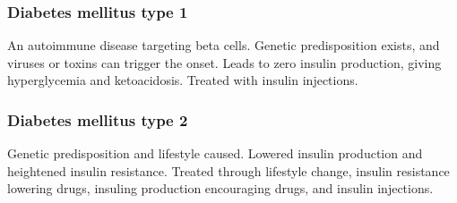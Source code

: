 \subsubsection{Diabetes mellitus type 1}
An autoimmune disease targeting beta cells. Genetic predisposition exists, and viruses or toxins can trigger the onset. Leads to zero insulin production, giving hyperglycemia and ketoacidosis. Treated with insulin injections.

\subsubsection{Diabetes mellitus type 2}
Genetic predisposition and lifestyle caused. Lowered insulin production and heightened insulin resistance. Treated through lifestyle change, insulin resistance lowering drugs, insuling production encouraging drugs, and insulin injections.
